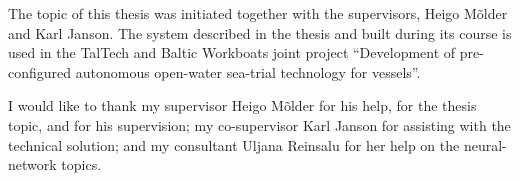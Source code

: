 The topic of this thesis was initiated together with the supervisors, Heigo Mõlder and Karl Janson. The system described in the thesis and built during its course is used in the TalTech and Baltic Workboats joint project ``Development of pre-configured autonomous open-water sea-trial technology for vessels''.

I would like to thank my supervisor Heigo Mõlder for his help, for the thesis topic, and for his supervision; my co-supervisor Karl Janson for assisting with the technical solution; and my consultant Uljana Reinsalu for her help on the neural-network topics.
